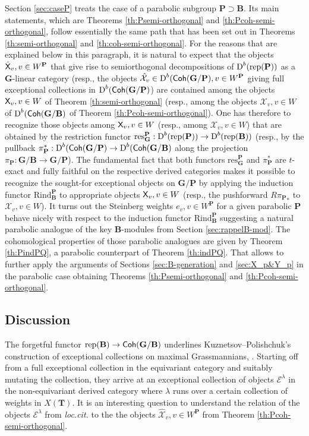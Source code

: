 \documentclass[sn-mathphys-num]{sn-jnl}%
\newcommand{\tX}{{\mathcal X}}
\newcommand{\rep}{{\mathrm{rep}}}
\newcommand{\res}{{\mathrm{res}}}
\newcommand{\Rind}{{\mathrm{Rind}}}
\newcommand*{\Dd}{\mathop{\mathrm D\kern0pt}\nolimits}
\newcommand*{\Coh}{\mathop{\sf {Coh}}\nolimits}
\newcommand{\bg}{\mathbf G}
\newcommand{\fb}{\mathbf B}
\newcommand{\bt}{\mathbf T}
\newcommand{\bp}{\mathbf P}
\theoremstyle{definition}
\begin{document}
Section \ref{sec:caseP} treats the case of a parabolic subgroup $\bp\supset \fb$. Its main statements, which are Theorems \ref{th:Psemi-orthogonal} and \ref{th:Pcoh-semi-orthogonal}, follow essentially the same path that has been set out in Theorems \ref{th:semi-orthogonal} and \ref{th:coh-semi-orthogonal}. For the reasons that are explained below in this paragraph, it is natural to expect that the objects ${\hat{\sf X}} _v, {v\in W^\bp}$ that give rise to semiorthogonal decompositions of $\Dd ^b(\rep(\bp))$ as a $\bg$-linear category (resp., the objects $\hat \tX_v\in \Dd ^b(\Coh(\bg/\bp), v\in W^\bp$ giving full exceptional collections in $\Dd ^b(\Coh(\bg/\bp)$) are contained among the objects ${\sf X} _v, {v\in W}$ of Theorem \ref{th:semi-orthogonal} (resp., among the objects $\tX_v, v\in W$ of $\Dd ^b(\Coh(\bg/\fb)$ of Theorem \ref{th:Pcoh-semi-orthogonal}). One has therefore to recognize those objects among ${\sf X} _v, {v\in W}$ (resp., among $\tX_v, v\in W$) that are obtained by the restriction functor $\res_{\bg}^{\bp}:\Dd ^b(\rep(\bp))\rightarrow \Dd ^b(\rep(\fb))$ (resp., by the pullback $\pi _{\bp}^{\ast}:\Dd ^b(\Coh(\bg/\bp)\rightarrow \Dd ^b(\Coh(\bg/\fb)$ along the projection $\pi _{\bp}:\bg/ \fb\rightarrow  \bg/ \bp$). The fundamental fact that both functors $\res_{\bg}^{\bp}$ and $\pi _{\bp}^{\ast}$ are $t$-exact and fully faithful on the respective derived categories makes it possible to recognize the sought-for exceptional objects on $\bg/ \bp$ by applying the induction functor $\Rind _{\fb}^{\bp}$ to 
appropriate objects ${\sf X} _v, {v\in W}$ (resp., the pushforward $R{\pi _{\bp}}_{\ast}$ to $\tX_v, v\in W$). It turns out the Steinberg weights $e_v, v\in W^\bp$ for a given parabolic $\bp$ behave nicely with respect to the induction functor $\Rind _{\fb}^{\bp}$ suggesting a natural parabolic analogue of the key $\fb$-modules from Section \ref{sec:rappelB-mod}. The cohomological properties of those parabolic analogues are given by Theorem \ref{th:PindPQ}, a parabolic counterpart of Theorem \ref{th:indPQ}. That allows to further apply the arguments of Sections \ref{sec:B-generation} and \ref{sec:X_p&Y_p} in the parabolic case obtaining Theorems \ref{th:Psemi-orthogonal} and \ref{th:Pcoh-semi-orthogonal}.


\subsection{Discussion}\label{sec:disc}
The forgetful functor $\rep( \fb)\rightarrow {\Coh}( \bg/ \fb)$ underlines Kuznetsov--Polishchuk's construction of exceptional collections on maximal Grassmannians, \cite{KuzPol}.
Starting off from a full exceptional collection in the equivariant category and suitably mutating the collection, they arrive at an exceptional collection of objects ${\mathcal E}^{\lambda}$ in the non-equivariant derived category where $\lambda$ runs over a certain collection of weights in $X( \bt)$. 
It is an interesting question to understand the relation of the objects ${\mathcal E}^{\lambda}$ from {\it loc.cit.} to the the objects $\hat \tX_v, v\in W^{\bp}$ from Theorem \ref{th:Pcoh-semi-orthogonal}. 
\end{document}

